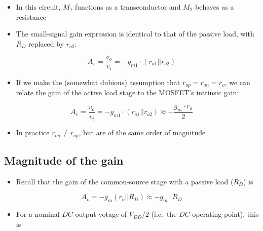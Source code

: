 \documentclass[11pt]{article}
\providecommand{\tightlist}{%
      \setlength{\itemsep}{0pt}\setlength{\parskip}{0pt}}
\begin{document}
    \begin{itemize}
\tightlist
\item
  In this circuit, \(M_1\) functions as a transconductor and \(M_2\)
  behaves as a resistance
\item
  The small-signal gain expression is identical to that of the passive
  load, with \(R_D\) replaced by \(r_{o2}\):
\end{itemize}

\begin{equation}
A_v = \dfrac{v_o}{v_i} = -g_{m1} \cdot (r_{o1} || r_{o2})
\end{equation}

\begin{itemize}
\tightlist
\item
  If we make the (somewhat dubious) assumption that
  \(r_{op} = r_{on} = r_o\), we can relate the gain of the active load
  stage to the MOSFET's intrinsic gain:
\end{itemize}

\begin{equation}
A_v = \dfrac{v_o}{v_i} = -g_{m1} \cdot (r_{o1} || r_{o2}) \approx -\dfrac{g_m\cdot r_o}{2}
\end{equation}

\begin{itemize}
\tightlist
\item
  In practice \(r_{on} \neq r_{op}\), but are of the same order of
  magnitude
\end{itemize}

    \hypertarget{magnitude-of-the-gain}{%
\subsection{Magnitude of the gain}\label{magnitude-of-the-gain}}

    \begin{itemize}
\tightlist
\item
  Recall that the gain of the common-source stage with a passive load
  (\(R_D\)) is
\end{itemize}

\begin{equation}
A_v = -g_m(r_o||R_D) \approx -g_m\cdot R_D
\end{equation}

\begin{itemize}
\tightlist
\item
  For a nominal \(DC\) output votage of \(V_{DD}/2\) (i.e.~the \(DC\)
  operating point), this is
\end{itemize}
\end{document}
